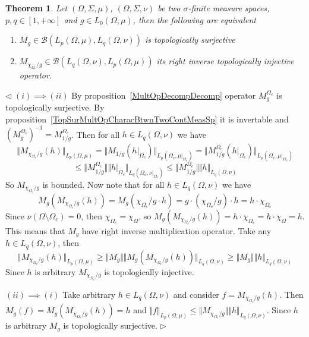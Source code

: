 \documentclass[12pt]{article}
\newtheorem{theorem}{Theorem}[subsection]
\newenvironment{proof}{\par $\triangleleft$}{$\triangleright$}
\begin{document}
\begin{theorem}\label{TopSurMultOpDescBtwnTwoMeasSp}
    Let $(\Omega,\Sigma,\mu)$, $(\Omega,\Sigma,\nu)$ be two $\sigma$-finite
    measure spaces, $p,q\in[1,+\infty]$ and $g\in L_0(\Omega,\mu)$, then the
    following are equivalent
    \begin{enumerate}[label = (\roman*)]
        \item $M_g\in\mathcal{B}(L_p(\Omega,\mu),L_q(\Omega,\nu))$ is
              topologically surjective

        \item $M_{\chi_{\Omega_c}/g}
                  \in\mathcal{B}(L_q(\Omega,\nu), L_p(\Omega,\mu))$ 
              its right inverse topologically injective operator.
    \end{enumerate}
\end{theorem}
\begin{proof}
    $(i)\implies (ii)$ By proposition~\ref{MultOpDecompDecomp} operator
    $M_g^{\Omega_c}$ is topologically surjective. By
    proposition~\ref{TopSurMultOpCharacBtwnTwoContMeasSp} it is invertable
    and ${(M_g^{\Omega_c})}^{-1}=M_{1/g}^{\Omega_c}$. Then for
    all $h\in L_q(\Omega,\nu)$ we have
    $$
        \Vert M_{\chi_{\Omega_c}/g}(h)\Vert_{L_p(\Omega,\mu)}= \Vert
        M_{1/g}(h|_{\Omega_c})\Vert_{L_p(\Omega_c,\mu|_{\Omega_c})}= \Vert
        M_{1/g}^{\Omega_c}(h|_{\Omega_c})\Vert_{L_p(\Omega_c,\mu|_{\Omega_c})}
    $$
    $$
        \leq\Vert M_{1/g}^{\Omega_c}\Vert\Vert
        h|_{\Omega_c}\Vert_{L_q(\Omega_c,\nu|_{\Omega_c})} \leq\Vert
        M_{1/g}^{\Omega_c}\Vert\Vert h\Vert_{L_q(\Omega,\nu)}
    $$
    So $M_{\chi_{\Omega_c}/g}$ is bounded. Now note that for
    all $h\in L_q(\Omega,\nu)$ we have
    $$
        M_g(M_{\chi_{\Omega_c}/g}(h)) =M_g(\chi_{\Omega_c}/g\cdot h)
        =g\cdot(\chi_{\Omega_c}/g)\cdot  h =h\cdot\chi_{\Omega_c}
    $$
    Since $\nu(\Omega\setminus\Omega_c)=0$, then
    $\chi_{\Omega_c}=\chi_{\Omega}$, so
    $M_g(M_{\chi_{\Omega_c}/g}(h))=h\cdot\chi_{\Omega_c}=h\cdot\chi_{\Omega}=h$.
    This means that $M_g$ have right inverse multiplication operator.
    Take any $h\in L_q(\Omega,\nu)$, then
    $$
        \Vert M_{\chi_{\Omega_c}/g}(h)\Vert_{L_p(\Omega,\mu)} \geq\Vert
        M_g\Vert\Vert M_g(M_{\chi_{\Omega_c}/g}(h))\Vert_{L_q(\Omega,\nu)}
        \geq\Vert M_g\Vert\Vert h\Vert_{L_q(\Omega,\nu)}
    $$
    Since $h$ is arbitrary $M_{\chi_{\Omega_c}/g}$ is topologically injective.

    $(ii)\implies (i)$ Take arbitrary $h\in L_q(\Omega,\nu)$ and consider
    $f=M_{\chi_{\Omega_c}/g}(h)$. Then $M_g(f)=M_g(M_{\chi_{\Omega_c}/g}(h))=h$
    and $\Vert f\Vert_{L_p(\Omega,\mu)}
        \leq\Vert M_{\chi_{\Omega_c}/g}\Vert\Vert h\Vert_{L_q(\Omega,\nu)}$. 
    Since $h$ is arbitrary $M_g$ is topologically surjective.
\end{proof}
\end{document}
